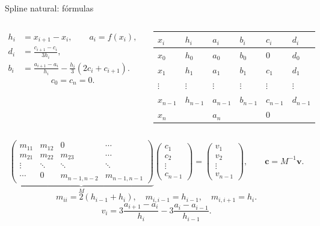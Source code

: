 \documentclass[main.tex]{subfiles}
\begin{document}
\begin{frame}[t]{Spline natural: fórmulas}
\begin{columns}[T]\scriptsize\begin{align*}
h_i&=x_{i+1}-x_i,\qquad a_i=f(x_i),\\
d_i&=\frac{c_{i+1}-c_i}{3h_i},\\
b_i&=\frac{a_{i+1}-a_i}{h_i}-\frac{h_i}{3}(2c_i+c_{i+1}).
\end{align*}\[c_0=c_n=0.\]\begin{minipage}[t]{\textwidth}\begingroup\scriptsize\setlength{\tabcolsep}{2pt}\begin{center}\begin{tabular}{|C{.12\textwidth}|C{.12\textwidth}|C{.12\textwidth}|C{.12\textwidth}|C{.12\textwidth}|C{.12\textwidth}|}\hline
\rule[-2mm]{0pt}{5mm}$x_i$&$h_i$&$a_i$&$b_i$&$c_i$&$d_i$\\\hline
\rule[-2.5mm]{0pt}{5mm}$x_0$&$h_0$&$a_0$&$b_0$&$0$&$d_0$\\\hline
\rule[-2.5mm]{0pt}{5mm}$x_1$&$h_1$&$a_1$&$b_1$&$c_1$&$d_1$\\\hline
\rule[-2.5mm]{0pt}{5mm}$\vdots$&$\vdots$&$\vdots$&$\vdots$&$\vdots$&$\vdots$\\\hline
\rule[-2.5mm]{0pt}{5mm}$x_{n-1}$&$h_{n-1}$&$a_{n-1}$&$b_{n-1}$&$c_{n-1}$&$d_{n-1}$\\\hline
\rule[-2.5mm]{0pt}{5mm}$x_n$& &$a_n$& &$0$& \\\hline
\end{tabular}\end{center}\endgroup\end{minipage}\par
\end{columns}\scriptsize
\[\underbrace{\begin{pmatrix}
m_{11}&m_{12}&0&\cdots\\
m_{21}&m_{22}&m_{23}&\cdots\\
\vdots&\ddots&\ddots&\ddots\\
\cdots&0&m_{n-1,n-2}&m_{n-1,n-1}
\end{pmatrix}}_{M}
\begin{pmatrix}c_1\\c_2\\\vdots\\c_{n-1}\end{pmatrix}
=\begin{pmatrix}v_1\\v_2\\\vdots\\v_{n-1}\end{pmatrix},\qquad \boldsymbol c=M^{-1}\boldsymbol v.\]
\scriptsize
\[m_{ii}=2(h_{i-1}+h_i),\quad m_{i,i-1}=h_{i-1},\quad m_{i,i+1}=h_i.\]
\[v_i=3\frac{a_{i+1}-a_i}{h_i}-3\frac{a_i-a_{i-1}}{h_{i-1}}.\]
\end{frame}
\end{document}
